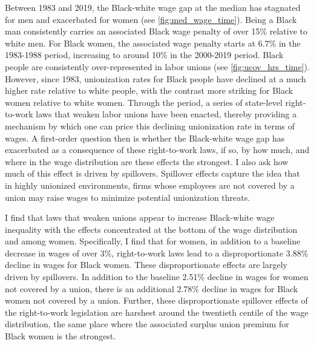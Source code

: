 \documentclass[11pt]{article}
\begin{document}
Between 1983 and 2019, the Black-white wage gap at the median has stagnated for men and exacerbated for women (see \autoref{fig:med_wage_time}). Being a Black man consistently carries an associated Black wage penalty of over 15\% relative to white men. For Black women, the associated wage penalty starts at 6.7\% in the 1983-1988 period, increasing to around 10\% in the 2000-2019 period. Black people are consistently over-represented in labor unions (see \autoref{fig:ucov_hrs_time}). However, since 1983, unionization rates for Black people have declined at a much higher rate relative to white people, with the contrast more striking for Black women relative to white women. Through the period, a series of state-level right-to-work laws that weaken labor unions have been enacted, thereby providing a mechanism by which one can price this declining unionization rate in terms of wages. A first-order question then is whether the Black-white wage gap has exacerbated as a consequence of these right-to-work laws, if so, by how much, and where in the wage distribution are these effects the strongest. I also ask how much of this effect is driven by spillovers. Spillover effects capture the idea that in highly unionized environments, firms whose employees are not covered by a union may raise wages to minimize potential unionization threats. 

I find that laws that weaken unions appear to increase Black-white wage inequality with the effects concentrated at the bottom of the wage distribution and among women. Specifically, I find that for women, in addition to a baseline decrease in wages of over 3\%, right-to-work laws lead to a disproportionate 3.88\% decline in wages for Black women. These disproportionate effects are largely driven by spillovers. In addition to the baseline 2.51\% decline in wages for women not covered by a union, there is an additional 2.78\% decline in wages for Black women not covered by a union. Further, these disproportionate spillover effects of the right-to-work legislation are harshest around the twentieth centile of the wage distribution, the same place where the associated surplus union premium for Black women is the strongest.
\end{document}
